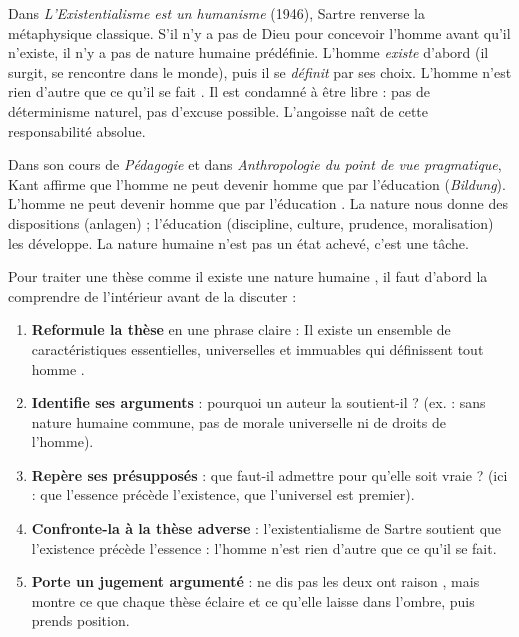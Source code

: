 \documentclass[11pt]{article}
\newcommand{\cle}[1]{{\popxbold\color{popdark}#1}}
\begin{document}
\begin{propriete}
Dans \emph{L'Existentialisme est un humanisme} (1946), Sartre renverse la métaphysique classique. S'il n'y a pas de Dieu pour concevoir l'homme avant qu'il n'existe, il n'y a pas de nature humaine prédéfinie. L'homme \emph{existe} d'abord (il surgit, se rencontre dans le monde), puis il se \emph{définit} par ses choix. \guillemotleft L'homme n'est rien d'autre que ce qu'il se fait \guillemotright. Il est \cle{condamné à être libre} : pas de déterminisme naturel, pas d'excuse possible. L'angoisse naît de cette responsabilité absolue.
\end{propriete}

\begin{propriete}
Dans son cours de \emph{Pédagogie} et dans \emph{Anthropologie du point de vue pragmatique}, Kant affirme que l'homme ne peut devenir homme que par l'éducation (\emph{Bildung}). \guillemotleft L'homme ne peut devenir homme que par l'éducation \guillemotright. La nature nous donne des dispositions (anlagen) ; l'éducation (discipline, culture, prudence, moralisation) les développe. La nature humaine n'est pas un état achevé, c'est une \cle{tâche}.
\end{propriete}

\begin{methode}
Pour traiter une thèse comme \guillemotleft il existe une nature humaine \guillemotright, il faut d'abord la comprendre de l'intérieur avant de la discuter :
\begin{enumerate}
\item \textbf{Reformule la thèse} en une phrase claire : \guillemotleft Il existe un ensemble de caractéristiques essentielles, universelles et immuables qui définissent tout homme \guillemotright.
\item \textbf{Identifie ses arguments} : pourquoi un auteur la soutient-il ? (ex. : sans nature humaine commune, pas de morale universelle ni de droits de l'homme).
\item \textbf{Repère ses présupposés} : que faut-il admettre pour qu'elle soit vraie ? (ici : que l'essence précède l'existence, que l'universel est premier).
\item \textbf{Confronte-la à la thèse adverse} : l'existentialisme de Sartre soutient que \guillemotleft l'existence précède l'essence \guillemotright : l'homme n'est rien d'autre que ce qu'il se fait.
\item \textbf{Porte un jugement argumenté} : ne dis pas \guillemotleft les deux ont raison \guillemotright, mais montre ce que chaque thèse éclaire et ce qu'elle laisse dans l'ombre, puis prends position.
\end{enumerate}
\end{methode}
\end{document}
